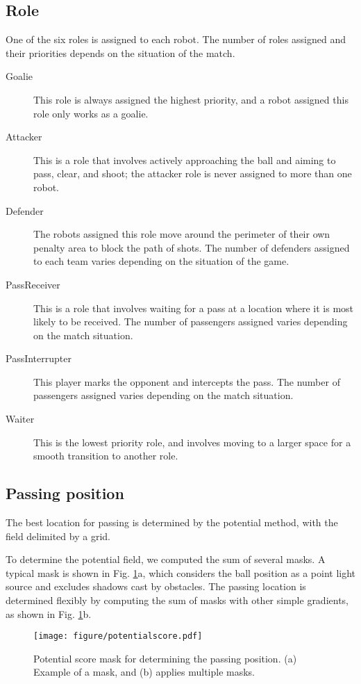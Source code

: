 \documentclass[]{llncs}
\begin{document}
\subsection{Role}
%
One of the six roles is assigned to each robot. The number of roles assigned and their priorities depends on the situation of the match. 
%
\begin{description}
    \item[Goalie] This role is always assigned the highest priority, and a robot assigned this role only works as a goalie.
    \item[Attacker] This is a role that involves actively approaching the ball and aiming to pass, clear, and shoot; the attacker role is never assigned to more than one robot.
    \item[Defender] The robots assigned this role move around the perimeter of their own penalty area to block the path of shots. The number of defenders assigned to each team varies depending on the situation of the game. 
    \item[PassReceiver]  This is a role that involves waiting for a pass at a location where it is most likely to be received. The number of passengers assigned varies depending on the match situation. 
    \item[PassInterrupter] This player marks the opponent and intercepts the pass. The number of passengers assigned varies depending on the match situation. 
    \item[Waiter] This is the lowest priority role, and involves moving to a larger space for a smooth transition to another role.
 \end{description}


\subsection{Passing position}
%
The best location for passing is determined by the potential method, with the field delimited by a grid.
%

To determine the potential field, we computed the sum of several masks.
%
A typical mask is shown in Fig. \ref{fig:potentialscore}a, which considers the ball position as a point light source and excludes shadows cast by obstacles.
%
The passing location is determined flexibly by computing the sum of masks with other simple gradients, as shown in Fig. \ref{fig:potentialscore}b.
%
\begin{figure}[ttbp]
    \centering
    \texttt{[image: figure/potentialscore.pdf]}
    \caption{Potential score mask for determining the passing position. (a) Example of a mask, and (b) applies multiple masks.}
    \label{fig:potentialscore}
\end{figure}
\end{document}
